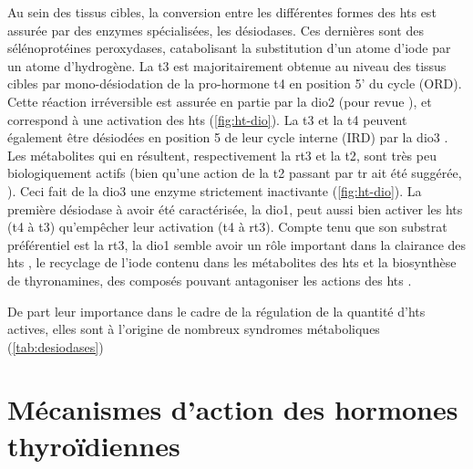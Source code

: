

Au sein des tissus cibles, la conversion entre les différentes formes des \glspl{ht} est assurée par des enzymes spécialisées, les désiodases.
Ces dernières sont des sélénoprotéines peroxydases, catabolisant la substitution d'un atome d'iode par un atome d'hydrogène.
La \gls{t3} est majoritairement obtenue au niveau des tissus cibles par mono-désiodation de la pro-hormone \gls{t4} en position 5' du cycle (ORD).
Cette réaction irréversible est assurée en partie par la \gls{dio2} (pour revue \citet{Williams2011}), et correspond à une activation des \glspl{ht} (\autoref{fig:ht-dio}).
La \gls{t3} et la \gls{t4} peuvent également être désiodées en position 5 de leur cycle interne (IRD) par la \gls{dio3} \citep{Dentice2011}.
Les métabolites qui en résultent, respectivement la \gls{rt3} et la \gls{t2}, sont très peu biologiquement actifs (bien qu'une action de la \gls{t2} passant par \gls{tr} ait été suggérée, \citet{Mendoza2013}).
Ceci fait de la \gls{dio3} une enzyme strictement inactivante (\autoref{fig:ht-dio}).
La première désiodase à avoir été caractérisée, la \gls{dio1}, peut aussi bien activer les \glspl{ht} (\gls{t4} à \gls{t3}) qu'empêcher leur activation (\gls{t4} à \gls{rt3}).
Compte tenu que son substrat préférentiel est la \gls{rt3}, la \gls{dio1} semble avoir un rôle important dans la clairance des \glspl{ht} \citep{Maia2011}, le recyclage de l'iode contenu dans les métabolites des \glspl{ht} \citep{Schneider2006} et la biosynthèse de thyronamines, des composés pouvant antagoniser les actions des \glspl{ht} \citep{Scanlan2004}.



De part leur importance dans le cadre de la régulation de la quantité d'\glspl{ht} actives, elles sont à l'origine de nombreux syndromes métaboliques (\autoref{tab:desiodases})






\section{Mécanismes d'action des hormones thyroïdiennes}

